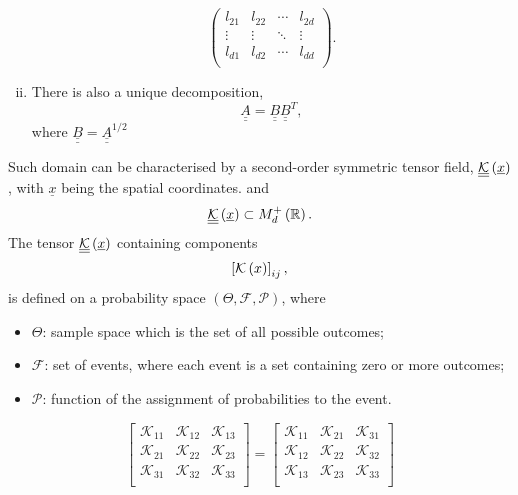 \begin{shaded}
\begin{enumerate}[i)]
\begin{displaymath}
\begin{pmatrix}
  l_{21}    &   l_{22}     & \cdots   & l_{2d}   \\
  \vdots   &    \vdots   & \ddots   & \vdots  \\
  l_{d1}    &   l_{d2}     & \cdots   & l_{dd}   \\
\end{pmatrix}.
     \end{displaymath}
%     
     \item\label{prop4} There is also a unique decomposition,
     \begin{equation}
       \underline{\underline{A}} =  \underline{\underline{B}}\underline{\underline{B}}^{T},
     \end{equation}
     where $\underline{\underline{B}} = \underline{\underline{A}}^{1/2}$
%     
\end{enumerate}

%
\end{shaded}


Such domain can be characterised by a second-order symmetric tensor field, $\underline{\underline{\mathcal{K}}}\left(\underline{x}\right)$, with $\underline{x}$ being the spatial coordinates. 
and 
\begin{displaymath}
  \underline{\underline{\mathcal{K}}}\left(\underline{x}\right) \subset M_{d}^{+}\left(\mathbb{R}\right).
\end{displaymath}
The tensor $\underline{\underline{\mathcal{K}}}\left(\underline{x}\right)$ containing components
\begin{displaymath}
  \left[\mathcal{K}\left(x\right)\right]_{ij},
\end{displaymath}
is defined on a probability space $\left(\Theta, \mathcal{F}, \mathcal{P}\right)$, where
\begin{itemize}
   \item $\Theta$: sample space which is the set of all possible outcomes;
    \item $\mathcal{F}$: set of events, where each event is a set containing zero or more outcomes;
    \item $\mathcal{P}$: function of the assignment of probabilities to the event.
\end{itemize}

\[
\begin{bmatrix}
  \mathcal{K}_{11}  & \mathcal{K}_{12}  & \mathcal{K}_{13} \\
  \mathcal{K}_{21}  & \mathcal{K}_{22}  & \mathcal{K}_{23} \\
  \mathcal{K}_{31}  & \mathcal{K}_{32}  & \mathcal{K}_{33} \\
\end{bmatrix}
=
\begin{bmatrix}
  \mathcal{K}_{11}  & \mathcal{K}_{21}  & \mathcal{K}_{31} \\
  \mathcal{K}_{12}  & \mathcal{K}_{22}  & \mathcal{K}_{32} \\
  \mathcal{K}_{13}  & \mathcal{K}_{23}  & \mathcal{K}_{33} \\
\end{bmatrix}
\]
